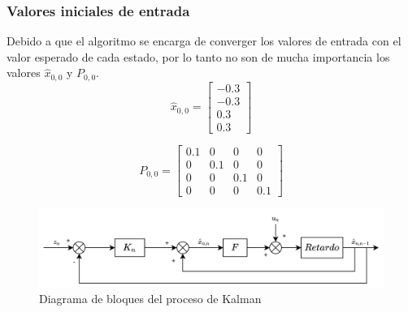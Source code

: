 		\subsubsection*{Valores iniciales de entrada}
		Debido a que el algoritmo se encarga de converger los valores de entrada con el valor esperado de cada estado, por lo tanto no son de mucha importancia los valores $\hat{x}_{0,0}$ y $P_{0,0}$.
\begin{equation}
\hat{x}_{0,0} = \begin{bmatrix}
-0.3\\ 
-0.3\\ 
0.3\\ 
0.3
\end{bmatrix}
\label{eq:initial_state_vector}
\end{equation}

\begin{equation}
P_{0,0} 
=
\begin{bmatrix}
0.1 & 0   & 0   & 0\\ 
0   & 0.1 & 0   & 0\\
0   & 0   & 0.1 & 0\\
0   & 0   & 0   & 0.1
\end{bmatrix}
\label{eq:initial_cov_vector}
\end{equation}	

\begin{figure}
	\centering
	\includegraphics[scale=0.07]{images/kalman_block_diagram.png}
	\caption{Diagrama de bloques del proceso de Kalman}
	\label{fig:kalman_block_diagram}
\end{figure}